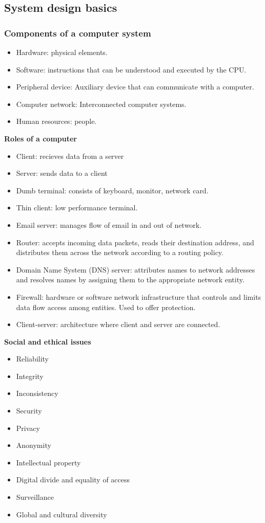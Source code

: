 \documentclass{article}
\begin{document}
\subsection{System design basics}

\subsubsection{Components of a computer system}

\begin{itemize}
    \item Hardware: physical elements.
    \item Software: instructions that can be understood and executed by the
        CPU.
    \item Peripheral device: Auxiliary device that can communicate with a
        computer.
    \item Computer network: Interconnected computer systems.
    \item Human resources: people.
\end{itemize}

\textbf{Roles of a computer}
\begin{itemize}
    \item Client: recieves data from a server
    \item Server: sends data to a client
    \item Dumb terminal: consists of keyboard, monitor, network card.
    \item Thin client: low performance terminal.
    \item Email server: manages flow of email in and out of network.
    \item Router: accepts incoming data packets, reads their destination address, and
        distributes them across the network according to a routing policy.
    \item Domain Name System (DNS) server: attributes names to network addresses and
        resolves names by assigning them to the appropriate network entity.
    \item Firewall: hardware or software network infrastructure that controls and
        limits data flow access among entities. Used to offer protection.
    \item Client-server: architecture where client and server are connected.
\end{itemize}

\textbf{Social and ethical issues}
\begin{itemize}
    \item Reliability
    \item Integrity
    \item Inconsistency
    \item Security
    \item Privacy
    \item Anonymity
    \item Intellectual property
    \item Digital divide and equality of access
    \item Surveillance
    \item Global and cultural diversity
\end{itemize}
\end{document}
